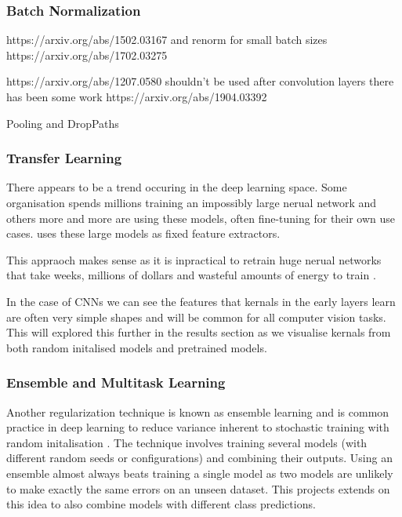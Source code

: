 \subsubsection{Batch Normalization}
https://arxiv.org/abs/1502.03167 and renorm for small batch sizes https://arxiv.org/abs/1702.03275

https://arxiv.org/abs/1207.0580 shouldn't be used after convolution layers \cite{} there has been some work https://arxiv.org/abs/1904.03392

Pooling and DropPaths

\subsubsection{Transfer Learning}
There appears to be a trend occuring in the deep learning space.  Some organisation spends millions training an impossibly large nerual network
and others more and more are using these models, often fine-tuning for their own use cases.  \cite{} uses these large models as fixed feature extractors.

This appraoch makes sense as it is inpractical to retrain huge nerual networks that take weeks, millions of dollars and wasteful amounts of energy
to train \cite{}.

In the case of CNNs we can see the features that kernals in the early layers learn \cite{} are often very simple shapes and will be common for all
computer vision tasks.  This will explored this further in the results section as we visualise kernals from both random initalised models and 
pretrained models.

\subsubsection{Ensemble and Multitask Learning}
Another regularization technique is known as ensemble learning and is common practice in deep learning to reduce variance inherent to stochastic training 
with random initalisation \cite{deeplearningbook}.  The technique involves training several models (with different random seeds or configurations) and 
combining their outputs. Using an ensemble almost always beats training a single model as two models are unlikely to make exactly the same errors on an unseen dataset.
This projects extends on this idea to also combine models with different class predictions.

